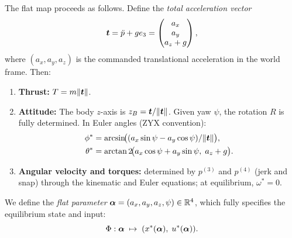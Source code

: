 The flat map proceeds as follows.
Define the \emph{total acceleration vector}
\begin{equation}\label{eq:tvec}
  \bm{t} = \ddot{p} + g e_3 = \begin{pmatrix} a_x \\ a_y \\ a_z + g \end{pmatrix},
\end{equation}
where $(a_x, a_y, a_z)$ is the commanded translational acceleration
in the world frame.
Then:
\begin{enumerate}
  \item \textbf{Thrust:} $T = m \| \bm{t} \|$.
  \item \textbf{Attitude:} The body $z$-axis is
    $z_B = \bm{t} / \|\bm{t}\|$.
    Given yaw $\psi$, the rotation $R$ is fully determined.
    In Euler angles (ZYX convention):
    \begin{align}
      \phi^* &= \arcsin\!\bigl(
        (a_x \sin\psi - a_y \cos\psi) / \|\bm{t}\| \bigr), \label{eq:phi_eq} \\
      \theta^* &= \arctan2\!\bigl(
        a_x \cos\psi + a_y \sin\psi, \; a_z + g \bigr). \label{eq:theta_eq}
    \end{align}
  \item \textbf{Angular velocity and torques:}
    determined by $p^{(3)}$ and $p^{(4)}$ (jerk and snap) through the
    kinematic and Euler equations; at equilibrium, $\omega^* = 0$.
\end{enumerate}

We define the \emph{flat parameter}
$\bm{\alpha} = (a_x, a_y, a_z, \psi) \in \mathbb{R}^4$,
which fully specifies the equilibrium state and input:
\begin{equation}\label{eq:eq_map}
  \Phi: \bm{\alpha} \;\mapsto\; (x^*(\bm{\alpha}),\; u^*(\bm{\alpha})).
\end{equation}
